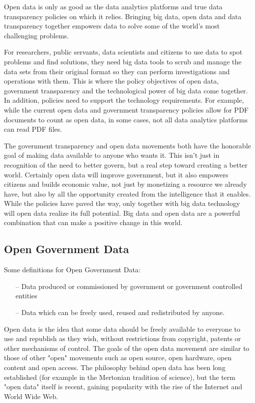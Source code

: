 \documentclass[12pt,a4paper,titlepage]{article}
\begin{document}
Open data is only as good as the data analytics platforms and true data transparency policies on which it relies. Bringing big data, open data and data transparency together empowers data to solve some of the world’s most challenging problems.

For researchers, public servants, data scientists and citizens to use data to spot problems and find solutions, they need big data tools to scrub and manage the data sets from their original format so they can perform investigations and operations with them. This is where the policy objectives of open data, government transparency and the technological power of big data come together. In addition, policies need to support the technology requirements. For example, while the current open data and government transparency policies allow for PDF documents to count as open data, in some cases, not all data analytics platforms can read PDF files.

The government transparency and open data movements both have the honorable goal of making data available to anyone who wants it. This isn’t just in recognition of the need to better govern, but a real step toward creating a better world. Certainly open data will improve government, but it also empowers citizens and builds economic value, not just by monetizing a resource we already have, but also by all the opportunity created from the intelligence that it enables. While the policies have paved the way, only together with big data technology will open data realize its full potential. Big data and open data are a powerful combination that can make a positive change in this world.

\subsection{Open Government Data}

Some definitions for Open Government Data:
\begin{itemize}
\item[--] Data produced or commissioned by government or government controlled entities
\item[--] Data which can be freely used, reused and redistributed by anyone.
\end{itemize}

Open data is the idea that some data should be freely available to everyone to use and republish as they wish, without restrictions from copyright, patents or other mechanisms of control. The goals of the open data movement are similar to those of other "open" movements such as open source, open hardware, open content and open access. The philosophy behind open data has been long established (for example in the Mertonian tradition of science), but the term "open data" itself is recent, gaining popularity with the rise of the Internet and World Wide Web.
\end{document}
